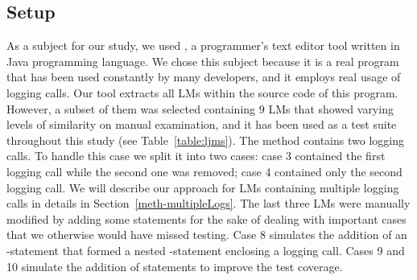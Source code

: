 \subsection{Setup}  \label{study1_setup}

As a subject for our study, we used , a programmer's text editor tool written in Java programming language. We chose this subject because it is a real program that has been used constantly by many developers, and it employs real usage of logging calls. Our tool extracts all LMs within the source code of this program. However, a subset of them was selected containing 9 LMs that showed varying levels of similarity on manual examination, and it has been used as a test suite throughout this study (see Table~\ref{table:ljms}). The  method contains two logging calls. To handle this case we split it into two cases: case 3 contained the first logging call while the second one was removed; case 4 contained only the second logging call. We will describe our approach for LMs containing multiple logging calls in details in Section~\ref{meth-multipleLogs}. The last three LMs were manually modified by adding some statements for the sake of dealing with important cases that we otherwise would have missed testing. Case 8 simulates the addition of an -statement that formed a nested -statement enclosing a logging call. Cases 9 and 10 simulate the addition of statements to improve the test coverage.



